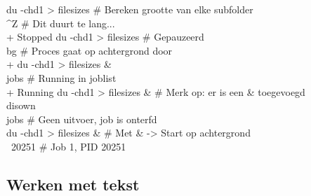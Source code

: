 \begin{bash}
\userprompt[~] du -chd1  > filesizes                    \# Bereken grootte van elke subfolder\\
\textasciicircum Z                                                     \# Dit duurt te lang...\\
\rbrack +  Stopped                 du -chd1 > filesizes     \# Gepauzeerd\\

\userprompt[~] bg                                       \# Proces gaat op achtergrond door\\
\rbrack + du -chd1 > filesizes \&\\

\userprompt[~] jobs                                     \# Running in joblist\\
\rbrack +  Running                 du -chd1 > filesizes \&   \# Merk op: er is een \& toegevoegd\\

\userprompt[~] disown\\

\userprompt[~] jobs                                     \# Geen uitvoer, job is onterfd\\

\userprompt[~] du -chd1  > filesizes \&                  \# Met \& -> Start op achtergrond\\
\rbrack \ 20251                                              \# Job 1, PID 20251\\
\end{bash}

\subsection{Werken met tekst}\label{werken-met-tekst}

